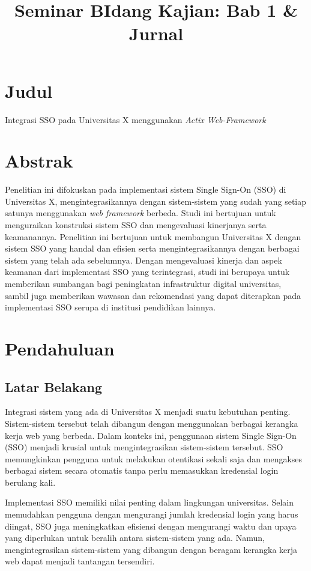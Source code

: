 \documentclass{article}
\title{Seminar BIdang Kajian: Bab 1 & Jurnal }
\begin{document}
\section*{Judul}
Integrasi SSO pada Universitas X menggunakan \emph{Actix Web-Framework}
\section*{Abstrak}
Penelitian ini difokuskan pada implementasi sistem Single Sign-On (SSO) di Universitas X, mengintegrasikannya dengan sistem-sistem yang sudah yang setiap satunya menggunakan \emph{web framework} berbeda. Studi ini bertujuan untuk menguraikan konstruksi sistem SSO dan mengevaluasi kinerjanya serta keamanannya.
Penelitian ini bertujuan untuk membangun Universitas X dengan sistem SSO yang handal dan efisien serta mengintegrasikannya dengan berbagai sistem yang telah ada sebelumnya. Dengan mengevaluasi kinerja dan aspek keamanan dari implementasi SSO yang terintegrasi, studi ini berupaya untuk memberikan sumbangan bagi peningkatan infrastruktur digital universitas, sambil juga memberikan wawasan dan rekomendasi yang dapat diterapkan pada implementasi SSO serupa di institusi pendidikan lainnya.

\section{Pendahuluan}
\subsection{Latar Belakang}

Integrasi sistem yang ada di Universitas X menjadi suatu kebutuhan penting. Sistem-sistem tersebut telah dibangun dengan menggunakan berbagai kerangka kerja web yang berbeda. Dalam konteks ini, penggunaan sistem Single Sign-On (SSO) menjadi krusial untuk mengintegrasikan sistem-sistem tersebut. SSO memungkinkan pengguna untuk melakukan otentikasi sekali saja dan mengakses berbagai sistem secara otomatis tanpa perlu memasukkan kredensial login berulang kali\cite{sciarretta2020formal}.

Implementasi SSO memiliki nilai penting dalam lingkungan universitas. Selain memudahkan pengguna dengan mengurangi jumlah kredensial login yang harus diingat, SSO juga meningkatkan efisiensi dengan mengurangi waktu dan upaya yang diperlukan untuk beralih antara sistem-sistem yang ada. Namun, mengintegrasikan sistem-sistem yang dibangun dengan beragam kerangka kerja web dapat menjadi tantangan tersendiri.
\end{document}
